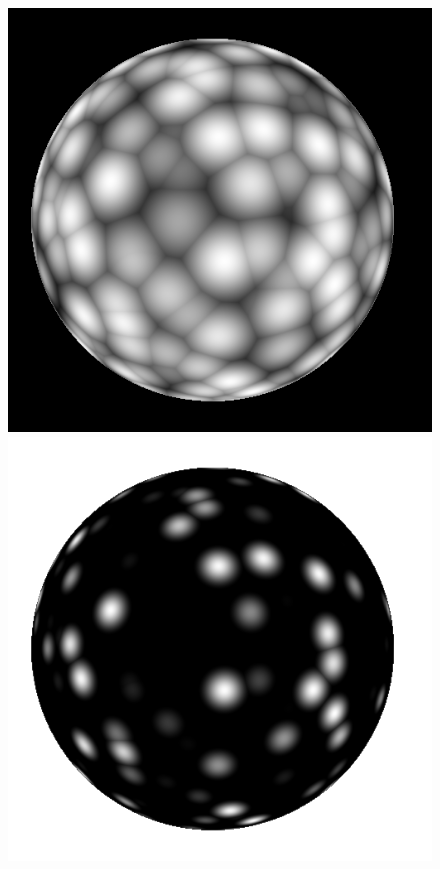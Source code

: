 \begin{figure}
    \begin{center}
    \includegraphics[scale=0.3]{images/noise/worley3d_thresh_1.png}
    \includegraphics[scale=0.3]{images/noise/worley3d_thresh_2.png}

\end{center}
\end{figure}
